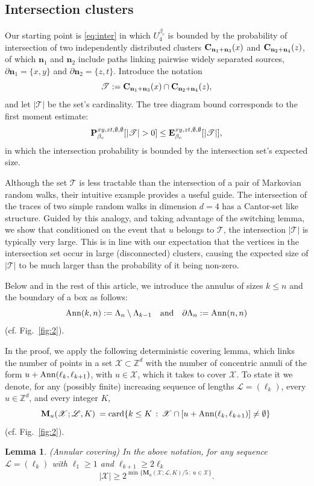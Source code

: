 \documentclass[a4paper,oneside,11pt]{article}
\def\Z{\mathbb{Z}}                          %
\newtheorem{lemma}[theorem]{Lemma}
\newcommand{\be}[1]{\begin{equation}\label{#1}}
\newcommand{\ee}{\end{equation}}
\numberwithin{equation}{section}
\numberwithin{equation}{section}
\numberwithin{equation}{section}
\newcommand{\calT}{\mathcal{T}}
\def\Z{\mathbb{Z}}                          %
\def\be{\begin{equation}}
\def\ee{\end{equation}}
\newcommand{\n}{\mathbf{n}}
\begin{document}
\subsection{Intersection clusters} \label{sec:2.1}  

Our starting point is \eqref{eq:inter} in which $U_4^{\beta_c}$ is bounded by the probability of intersection of two independently distributed clusters ${\bf C}_{\n_1+\n_3}(x)$ and ${\bf C}_{\n_2+\n_4}(z)$, of which $\n_1$ and $\n_2$  include paths linking pairwise widely separated sources,  $\partial \n_1=\{x,y\}$ and $\partial \n_2= \{ z,t\}$.  Introduce the notation 
\be 
\calT := {\bf C}_{\n_1+\n_3}(x) \cap  {\bf C}_{\n_2+\n_4}(z),
\ee  and let $|\calT|$ be the set's cardinality. 
The tree diagram bound corresponds to  the first moment estimate: 
\be 
{\bf P}^{xy,zt,\emptyset,\emptyset}_{\beta_c}[|\calT|>0] \leq {\bf E}^{xy,zt,\emptyset,\emptyset}_{\beta_c}[|\calT|],
\ee  
in which  the intersection probability is bounded  by the intersection set's expected size.  

Although the  set $\calT$  is less tractable than the intersection of a pair of  Markovian random walks, their intuitive example provides a useful guide.  The intersection of the traces of two simple random walks in dimension $d=4$  has a Cantor-set like structure.   Guided by this analogy, and taking advantage of the switching lemma, we show that  conditioned on the event that  $u$ belongs to $\calT$,  the intersection  $|\calT|$ is typically very large.  This is in line with our expectation that the vertices in the intersection set occur in large (disconnected) clusters, causing  
the expected size of  $|\calT|$ to be much larger than the probability of it being non-zero.  

Below and in the rest of this article, we introduce the annulus of sizes $k\le n$ and the boundary of a box as follows:
\be
{\rm Ann}(k,n):=\Lambda_n\setminus\Lambda_{k-1}\quad\text{and}\quad\partial\Lambda_n:={\rm Ann}(n,n)
\ee
(cf. Fig.~\ref{fig:2}).


In the proof, we apply the following deterministic covering lemma, which  links the number of points in a set $\mathcal X\subset\Z^d$  with the number of concentric annuli of the form 
$u+{\rm Ann}(\ell_k,\ell_{k+1})$,  with $u\in \mathcal X$, which it takes to cover $\mathcal X$. 
To state it we denote, for any (possibly finite) increasing sequence of lengths $\mathcal L = (\ell_k)$, every $u\in \Z^d$,  and every integer $K$, 
\be 
{\bf M}_u(\mathcal X;\mathcal L, K) \:= \text{card}\{k\le K\,:\, \mathcal X\cap [u+{\rm Ann}(\ell_k,\ell_{k+1})]\neq \emptyset\}\,   
\ee 
(cf. Fig.~\ref{fig:2}).  
\begin{lemma} (Annular covering) \label{covering} 
In the above notation, for any sequence  $\mathcal L = (\ell_k)$ with  $\ell_1\ge 1$ and 
$ \ell_{k+1} \geq 2 \ell_k$
\be
|\mathcal X|\ge 2^{\min\{\mathbf M_u(\mathcal X;\mathcal L, K)/5\,:\,u\in\mathcal X\}}.
\ee
\end{lemma} 
\end{document}
